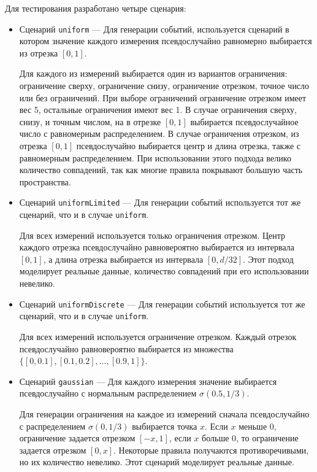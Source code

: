 \documentclass[14pt]{article}
\begin{document}
Для тестирования разработано четыре сценария:
\begin{itemize}
    \item Сценарий \verb|uniform| --- Для генерации событий, используется сценарий в котором значение каждого измерения псевдослучайно равномерно выбирается из отрезка $[0, 1]$.

    Для каждого из измерений выбирается один из вариантов ограничения: ограничение сверху, ограничение снизу, ограничение отрезком, точное число или без ограничений. При выборе ограничений ограничение отрезком имеет вес 5, остальные ограничения имеют вес 1. В случае ограничения сверху, снизу, и точным числом, на в отрезке $[0, 1]$ выбирается псевдослучайное число с равномерным распределением. В случае ограничения отрезком, из отрезка $[0, 1]$ псевдослучайно выбирается центр и длина отрезка, также с равномерным распределением. При использовании этого подхода велико количество совпадений, так как многие правила покрывают большую часть пространства.

    \item Сценарий \verb|uniformLimited| --- Для генерации событий используется тот же сценарий, что и в случае \verb|uniform|.

    Для всех измерений используется только ограничения отрезком. Центр каждого отрезка псевдослучайно равновероятно выбирается из интервала $[0, 1]$, а длина отрезка выбирается из интервала $[0, d / 32]$. Этот подход моделирует реальные данные, количество совпадений при его использовании невелико.

    \item Сценарий \verb|uniformDiscrete| --- Для генерации событий используется тот же сценарий, что и в случае \verb|uniform|.

    Для всех измерений используется ограничение отрезком. Каждый отрезок псевдослучайно равновероятно выбирается из множества\\ $\{[0, 0.1], [0.1, 0.2],\dots,[0.9, 1]\}$.

    \item Сценарий \verb|gaussian| --- Для каждого измерения значение выбирается псевдослучайно с нормальным распределением $\sigma(0.5, 1/3)$.

    Для генерации ограничения на каждое из измерений сначала псевдослучайно с распределением $\sigma(0, 1/3)$ выбирается точка $x$. Если $x$ меньше 0, ограничение задается отрезком $[-x, 1]$, если $x$ больше 0, то ограничение задается отрезком $[0, x]$. Некоторые правила получаются противоречивыми, но их количество невелико. Этот сценарий моделирует реальные данные.

\end{itemize}
\end{document}
